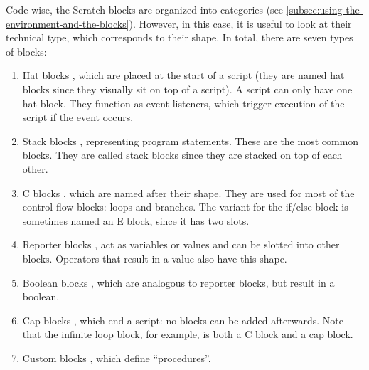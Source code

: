 \documentclass[../main]{subfiles}
\begin{document}
Code-wise, the Scratch blocks are organized into categories (see \cref{subsec:using-the-environment-and-the-blocks}).
However, in this case, it is useful to look at their technical type, which corresponds to their shape.
In total, there are seven types of blocks:

\begin{enumerate}[noitemsep]
    \item Hat blocks \scratchinline{\blockinit{\hspace{1em}\dots\hspace*{1em}}}, which are placed at the start of a script (they are named hat blocks since they visually sit on top of a script).
        A script can only have one hat block.
        They function as event listeners, which trigger execution of the script if the event occurs.
    \item Stack blocks \scratchinline{\blockmove{\hspace{1em}\dots\hspace*{0.5cm}}}, representing program statements.
        These are the most common blocks.
        They are called stack blocks since they are stacked on top of each other.
    \item C blocks \scratchinline{\blockif{\hspace{1em}\dots\hspace*{1em}}{\blockspace[0.2]}}, which are named after their shape.
        They are used for most of the control flow blocks: loops and branches.
        The variant for the if/else block is sometimes named an E block, since it has two slots.
    \item Reporter blocks \ovalmove{\hspace{1em}\dots\hspace*{1em}}, act as variables or values and can be slotted into other blocks.
        Operators that result in a value also have this shape.
    \item Boolean blocks \boolsensing{\hspace{1em}\dots\hspace*{1em}}, which are analogous to reporter blocks, but result in a boolean.
    \item Cap blocks \scratchinline{\blockstop{\hspace{1em}\dots\hspace*{1em}}}, which end a script: no blocks can be added afterwards.
        Note that the infinite loop block, for example, is both a C block and a cap block.
    \item Custom blocks , which define ``procedures''.
\end{enumerate}
\end{document}
